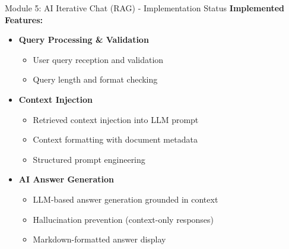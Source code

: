 \documentclass[aspectratio=169,xcolor=dvipsnames]{beamer}
\begin{document}
\begin{frame}{Module 5: AI Iterative Chat (RAG) - Implementation Status}
    \large
    \textbf{Implemented Features:}
    \begin{itemize}
        \item \checkmark \textbf{Query Processing \& Validation}
        \begin{itemize}
            \normalsize
            \item User query reception and validation
            \item Query length and format checking
        \end{itemize}
        
        \vspace{0.5em}
        \item \checkmark \textbf{Context Injection}
        \begin{itemize}
            \normalsize
            \item Retrieved context injection into LLM prompt
            \item Context formatting with document metadata
            \item Structured prompt engineering
        \end{itemize}
        
        \vspace{0.5em}
        \item \checkmark \textbf{AI Answer Generation}
        \begin{itemize}
            \normalsize
            \item LLM-based answer generation grounded in context
            \item Hallucination prevention (context-only responses)
            \item Markdown-formatted answer display
        \end{itemize}
    \end{itemize}
\end{frame}
\end{document}
